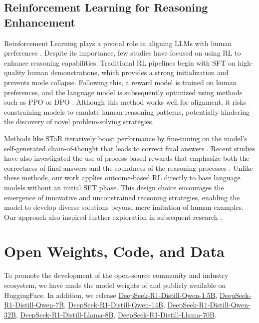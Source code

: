 \subsection{Reinforcement Learning for Reasoning Enhancement}

Reinforcement Learning plays a pivotal role in aligning LLMs with human preferences \citep{ouyang2022training, bai2022training}. Despite its importance, few studies have focused on using RL to enhance reasoning capabilities. Traditional RL pipelines begin with SFT on high-quality human demonstrations, which provides a strong initialization and prevents mode collapse. Following this, a reward model is trained on human preferences, and the language model is subsequently optimized using methods such as PPO \citep{schulman2017proximal} or DPO \citep{dpo}. Although this method works well for alignment, it risks constraining models to emulate human reasoning patterns, potentially hindering the discovery of novel problem-solving strategies.

Methods like STaR iteratively boost performance by fine-tuning on the model's self-generated chain-of-thought that leads to correct final answers \citep{zelikman2022star, yuan2023scaling, singh2024beyond}.
Recent studies have also investigated the use of process-based rewards that emphasize both the correctness of final answers and the soundness of the reasoning processes \citep{lightman2023let, mathshepherd,deepseekmath}.
Unlike these methods, our work applies outcome-based RL directly to base language models without an initial SFT phase. This design choice encourages the emergence of innovative and unconstrained reasoning strategies, enabling the model to develop diverse solutions beyond mere imitation of human examples.
Our approach also inspired further exploration in subsequent research \citep{tinyzero, liu2025oatzero, openr1}.


\section{Open Weights, Code, and Data} \label{sec:open}
To promote the development of the open-source community and industry ecosystem, we have made the model weights of \href{https://huggingface.co/deepseek-ai/DeepSeek-R1}{\dsri{}} and \href{https://huggingface.co/deepseek-ai/\dsro{}}{\dsro{}} publicly available on HuggingFace. In addition, we release   \href{https://huggingface.co/deepseek-ai/DeepSeek-R1-Distill-Qwen-1.5B}{DeepSeek-R1-Distill-Qwen-1.5B},  \href{https://huggingface.co/deepseek-ai/DeepSeek-R1-Distill-Qwen-7B}{DeepSeek-R1-Distill-Qwen-7B}, \href{https://huggingface.co/deepseek-ai/DeepSeek-R1-Distill-Qwen-14B}{DeepSeek-R1-Distill-Qwen-14B}, \href{https://huggingface.co/deepseek-ai/DeepSeek-R1-Distill-Qwen-32B}{DeepSeek-R1-Distill-Qwen-32B},        \href{https://huggingface.co/deepseek-ai/DeepSeek-R1-Distill-Llama-8B}{DeepSeek-R1-Distill-Llama-8B},        \href{https://huggingface.co/deepseek-ai/DeepSeek-R1-Distill-Llama-70B}{DeepSeek-R1-Distill-Llama-70B}.

